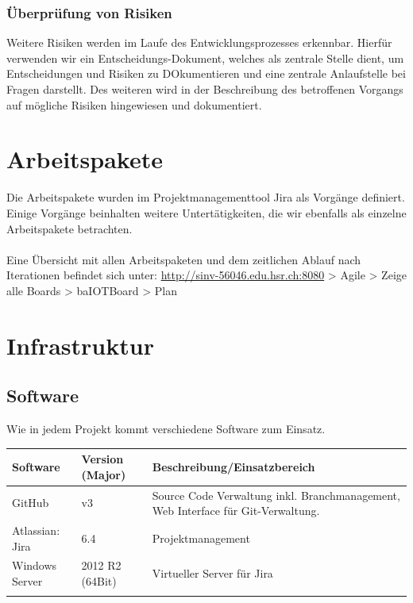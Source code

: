 \subsubsection*{Überprüfung von Risiken}
Weitere Risiken werden im Laufe des Entwicklungsprozesses erkennbar. Hierfür verwenden wir ein Entscheidungs-Dokument, welches als zentrale Stelle dient, um Entscheidungen und Risiken zu DOkumentieren und eine zentrale Anlaufstelle bei Fragen darstellt. Des weiteren wird in der Beschreibung des betroffenen Vorgangs auf mögliche Risiken hingewiesen und dokumentiert.
\pagebreak

\section*{Arbeitspakete}
Die Arbeitspakete wurden im Projektmanagementtool Jira als Vorgänge definiert. \\
Einige Vorgänge beinhalten weitere Untertätigkeiten, die wir ebenfalls als einzelne Arbeitspakete betrachten. \\
\\
Eine Übersicht mit allen Arbeitspaketen und dem zeitlichen Ablauf nach Iterationen befindet sich unter: \url{http://sinv-56046.edu.hsr.ch:8080} > Agile > Zeige alle Boards > baIOTBoard > Plan

\section*{Infrastruktur}
\subsection*{Software}
Wie in jedem Projekt kommt verschiedene Software zum Einsatz. \\

\begin{tabularx}{\textwidth}{llX}
	\textbf{Software}	& \textbf{Version (Major)} & \textbf{Beschreibung/Einsatzbereich} \\ \hline
	GitHub	& v3 & Source Code Verwaltung inkl. Branchmanagement, Web Interface für Git-Verwaltung. \\ \hline
	Atlassian: Jira & 6.4 & Projektmanagement \\ \hline
	Windows Server	& 2012 R2 (64Bit) & Virtueller Server für Jira \\ \hline
	\tbd & \tbd & \tbd \\ \hline
\end{tabularx}
\pagebreak


